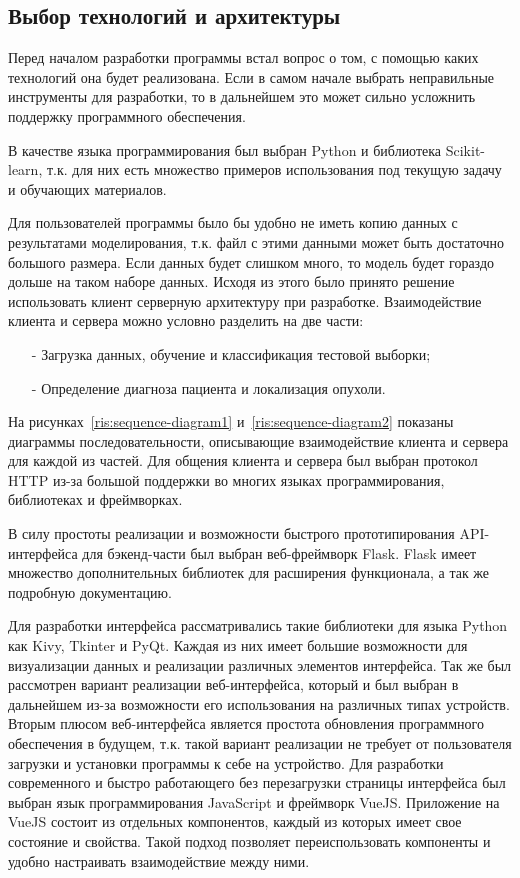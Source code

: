 \subsection{Выбор технологий и архитектуры}
Перед началом разработки программы встал вопрос о том, с помощью каких технологий она будет реализована. Если в самом начале выбрать неправильные инструменты для разработки, то в дальнейшем это может сильно усложнить поддержку программного обеспечения.
\par
В качестве языка программирования был выбран Python и библиотека Scikit-learn, т.к. для них есть множество примеров использования под текущую задачу и обучающих материалов.
\par
Для пользователей программы было бы удобно не иметь копию данных с результатами моделирования, т.к. файл с этими данными может быть достаточно большого размера. Если данных будет слишком много, то модель будет гораздо дольше на таком наборе данных. Исходя из этого было принято решение использовать клиент серверную архитектуру при разработке. Взаимодействие клиента и сервера можно условно разделить на две части:
\begin{itemize}
	\item[-] Загрузка данных, обучение и классификация тестовой выборки;
	\item[-] Определение диагноза пациента и локализация опухоли.
\end{itemize}
\par
На рисунках~\ref{ris:sequence-diagram1} и~\ref{ris:sequence-diagram2} показаны диаграммы последовательности, описывающие взаимодействие клиента и сервера для каждой из частей. Для общения клиента и сервера был выбран протокол HTTP из-за большой поддержки во многих языках программирования, библиотеках и фреймворках.
\par
В силу простоты реализации и возможности быстрого прототипирования API-интерфейса для бэкенд-части был выбран веб-фреймворк Flask. Flask имеет множество дополнительных библиотек для расширения функционала, а так же подробную документацию.
\par
Для разработки интерфейса рассматривались такие библиотеки для языка Python как Kivy, Tkinter и PyQt. Каждая из них имеет большие возможности для визуализации данных и реализации различных элементов интерфейса. Так же был рассмотрен вариант реализации веб-интерфейса, который и был выбран в дальнейшем из-за возможности его использования на различных типах устройств. Вторым плюсом веб-интерфейса является простота обновления программного обеспечения в будущем, т.к. такой вариант реализации не требует от пользователя загрузки и установки программы к себе на устройство. Для разработки современного и быстро работающего без перезагрузки страницы интерфейса был выбран язык программирования JavaScript и фреймворк VueJS. Приложение на VueJS состоит из отдельных компонентов, каждый из которых имеет свое состояние и свойства. Такой подход позволяет переиспользовать компоненты и удобно настраивать взаимодействие между ними.



